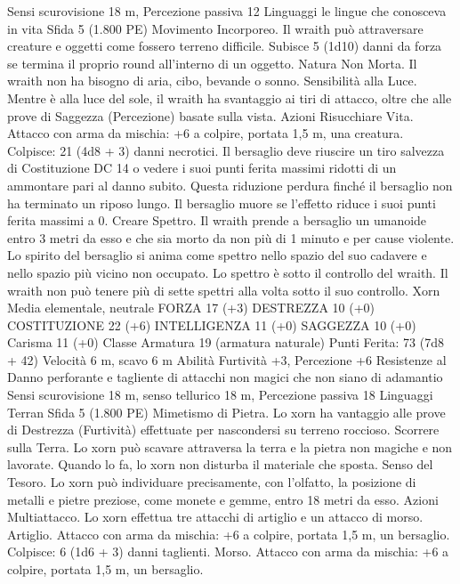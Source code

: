 \begin{multicols}{2}
Sensi scurovisione 18 m, Percezione passiva 12
Linguaggi le lingue che conosceva in vita
Sfida 5 (1.800 PE)
Movimento Incorporeo. Il wraith può attraversare creature e
oggetti come fossero terreno difficile. Subisce 5 (1d10) danni da
forza se termina il proprio round all’interno di un oggetto.
Natura Non Morta. Il wraith non ha bisogno di aria, cibo,
bevande o sonno.
Sensibilità alla Luce. Mentre è alla luce del sole, il wraith ha
svantaggio ai tiri di attacco, oltre che alle prove di Saggezza
(Percezione) basate sulla vista.
Azioni
Risucchiare Vita. Attacco con arma da mischia: +6 a colpire,
portata 1,5 m, una creatura.
Colpisce: 21 (4d8 + 3) danni necrotici. Il bersaglio deve riuscire
un tiro salvezza di Costituzione DC 14 o vedere i suoi punti
ferita massimi ridotti di un ammontare pari al danno subito.
Questa riduzione perdura finché il bersaglio non ha terminato un
riposo lungo. Il bersaglio muore se l’effetto riduce i suoi punti
ferita massimi a 0.
Creare Spettro. Il wraith prende a bersaglio un umanoide entro 3
metri da esso e che sia morto da non più di 1 minuto e per cause
violente. Lo spirito del bersaglio si anima come spettro nello
spazio del suo cadavere e nello spazio più vicino non occupato.
Lo spettro è sotto il controllo del wraith. Il wraith non può tenere
più di sette spettri alla volta sotto il suo controllo.
Xorn
Media elementale, neutrale
FORZA 17 (+3)
DESTREZZA 10 (+0)
COSTITUZIONE 22 (+6)
INTELLIGENZA 11 (+0)
SAGGEZZA 10 (+0)
Carisma 11 (+0)
Classe Armatura 19 (armatura naturale)
\hspace*{0pt}\hfill{Punti Ferita}: 73 (7d8 + 42)
Velocità 6 m, scavo 6 m
Abilità Furtività +3, Percezione +6
Resistenze al Danno perforante e tagliente di attacchi non
magici che non siano di adamantio
Sensi scurovisione 18 m, senso tellurico 18 m, Percezione
passiva 18
Linguaggi Terran
Sfida 5 (1.800 PE)
Mimetismo di Pietra. Lo xorn ha vantaggio alle prove di
Destrezza (Furtività) effettuate per nascondersi su terreno
roccioso.
Scorrere sulla Terra. Lo xorn può scavare attraversa la terra e la
pietra non magiche e non lavorate. Quando lo fa, lo xorn non
disturba il materiale che sposta.
Senso del Tesoro. Lo xorn può individuare precisamente, con
l’olfatto, la posizione di metalli e pietre preziose, come monete e
gemme, entro 18 metri da esso.
Azioni
Multiattacco. Lo xorn effettua tre attacchi di artiglio e un attacco
di morso.
Artiglio. Attacco con arma da mischia: +6 a colpire, portata 1,5
m, un bersaglio.
Colpisce: 6 (1d6 + 3) danni taglienti.
Morso. Attacco con arma da mischia: +6 a colpire, portata 1,5
m, un bersaglio.

\end{multicols}
